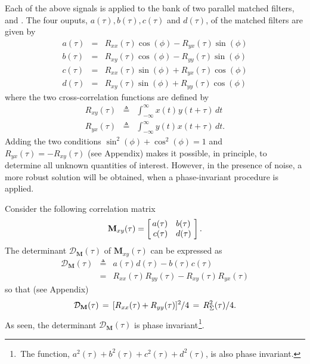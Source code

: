 \documentclass[journal]{IEEEtran}
\begin{document}
Each of the above signals is applied to the bank of two parallel matched filters, {} and {}. The four ouputs, $a(\tau), b(\tau), c(\tau)$ and $d(\tau)$, of the matched filters are given by
\begin{eqnarray}
	a(\tau) \!\! &\!\!=\!\!& \! R_{xx}(\tau) \cos(\phi) -R_{yx}(\tau) \sin(\phi)
	\nonumber \\
	b(\tau) \!\! &\!\!=\!\!& \! R_{xy}(\tau) \cos(\phi) -R_{yy}(\tau) \sin(\phi)
	\nonumber \\
	c(\tau) \!\! &\!\!=\!\!& \! R_{xx}(\tau) \sin(\phi) +R_{yx}(\tau) \cos(\phi)
	\nonumber \\
	d(\tau) \!\! &\!\!=\!\!& \! R_{xy}(\tau) \sin(\phi) +R_{yy}(\tau) \cos(\phi)
\end{eqnarray} 
where the two cross-correlation functions are defined by
\begin{eqnarray*}
	R_{xy}(\tau) \! &\!\!\triangleq\!\!& \!\!
	\int_{-\infty}^{\infty}\!\!
	x(t)\mspace{1mu} y(t+\tau) \, dt\\
	R_{yx}(\tau) \! &\!\!\triangleq\!\!& \!\!
	\int_{-\infty}^{\infty}\!\!
	y(t)\mspace{1mu} x(t+\tau) \, dt.
\end{eqnarray*}
Adding the two conditions $\sin^2(\phi)+\cos^2(\phi)=1$ and $R_{yx}(\tau)= -R_{xy}(\tau)$ (see Appendix)
makes it possible, in principle, to determine all unknown quantities of interest. However, in the presence of noise, a more robust solution will be obtained, when a phase-invariant procedure is applied.

Consider the following correlation matrix
\begin{equation*}
	\mathbf{M}_{xy}(\tau) =
	\left [
	\begin{array}{r@{\quad}l}\!\!a(\tau) & b(\tau)\!\\
		\!\!c(\tau) & d(\tau)\!
			\end{array} \right ] .  
\end{equation*}
The determinant $\mathcal{D}_{\mathbf{M}}(\tau)$ of $\mathbf{M}_{xy}(\tau)$ can be expressed as
\begin{eqnarray}
	\mathcal{D}_{\mathbf{M}}(\tau) &\!\!\triangleq\!\!& a(\tau)\mspace{1mu}d(\tau) - b(\tau)\mspace{1mu}c(\tau) \nonumber\\
	&\!\!=\!\!& R_{xx}(\tau)\mspace{1mu} R_{yy}(\tau)  -  R_{xy}(\tau) \mspace{1mu} R_{yx}(\tau)
	\end{eqnarray} 
so that (see Appendix) 
\begin{equation}
	\mathcal{D}_{\mathbf{M}}(\tau) \,=\, [R_{xx}(\tau)+ R_{yy}(\tau)]^2\mspace{-1mu}/4
	\,=\, R^2_\Sigma(\tau)/4.
\end{equation} 
As seen, the determinant $\mathcal{D}_{\mathbf{M}}(\tau)$ is phase 
invariant$\mspace{1mu}${\footnote {\,The function, $a^2(\tau)\!+\!b^2(\tau)\!+\!c^2(\tau)\!+\!d^2(\tau)$, is also phase invariant.}}.
\end{document}
